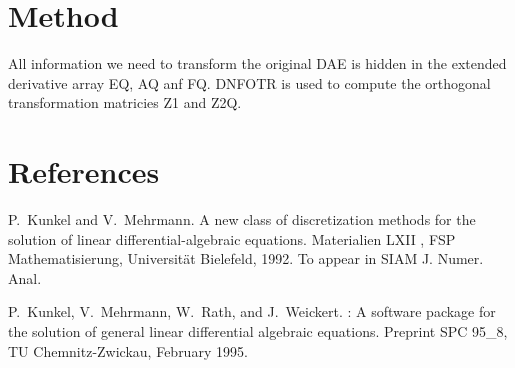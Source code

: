 
\section{Method}

All information we need to transform the original DAE is hidden in the
extended derivative array EQ, AQ anf FQ. DNFOTR is used to compute the 
orthogonal transformation matricies Z1 and Z2Q.

\section{References}

\begin{thebibliography}{1}
P.~Kunkel and V.~Mehrmann.
\newblock A new class of discretization methods for the solution of linear
  differential-algebraic equations.
\newblock Materialien LXII , FSP Mathematisierung, Universit{\"a}t Bielefeld,
  1992.
\newblock To appear in SIAM J. Numer. Anal.

P.~Kunkel, V.~Mehrmann, W.~Rath, and J.~Weickert.
: A software package for the solution of general linear
  differential algebraic equations.
\newblock Preprint SPC 95\_8, TU Chemnitz-Zwickau, February 1995.

\end{thebibliography}









